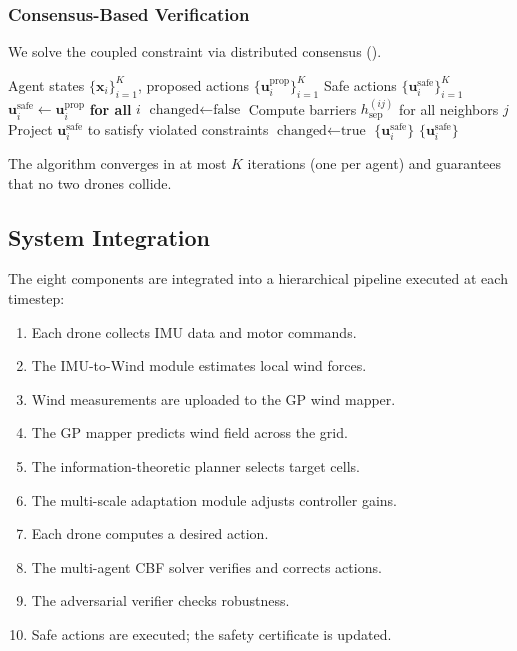 \documentclass[12pt,a4paper,twocolumn]{article}
\newcommand{\vect}[1]{\mathbf{#1}}
\begin{document}
\subsubsection{Consensus-Based Verification}
We solve the coupled constraint via distributed consensus ().

\begin{algorithm}[t]
\caption{Distributed Consensus Safety Verification}
\label{alg:consensus}
\begin{algorithmic}[1]
\Require Agent states $\{\vect{x}_i\}_{i=1}^K$, proposed actions $\{\vect{u}^{\text{prop}}_i\}_{i=1}^K$
\Ensure Safe actions $\{\vect{u}^{\text{safe}}_i\}_{i=1}^K$
\State $\vect{u}^{\text{safe}}_i \leftarrow \vect{u}^{\text{prop}}_i$ \textbf{for all} $i$
    \State $\text{changed} \leftarrow \text{false}$
        \State Compute barriers $h_{\text{sep}}^{(ij)}$ for all neighbors $j$
            \State Project $\vect{u}^{\text{safe}}_i$ to satisfy violated constraints
            \State $\text{changed} \leftarrow \text{true}$
        \EndIf
    \EndFor
        \State \Return $\{\vect{u}^{\text{safe}}_i\}$
    \EndIf
\EndFor
\State \Return $\{\vect{u}^{\text{safe}}_i\}$
\end{algorithmic}
\end{algorithm}

The algorithm converges in at most $K$ iterations (one per agent) and guarantees that no two drones collide.

\subsection{System Integration}
\label{sec:integration}

The eight components are integrated into a hierarchical pipeline executed at each timestep:

\begin{enumerate}[leftmargin=*]
    \item Each drone collects IMU data and motor commands.
    \item The IMU-to-Wind module estimates local wind forces.
    \item Wind measurements are uploaded to the GP wind mapper.
    \item The GP mapper predicts wind field across the grid.
    \item The information-theoretic planner selects target cells.
    \item The multi-scale adaptation module adjusts controller gains.
    \item Each drone computes a desired action.
    \item The multi-agent CBF solver verifies and corrects actions.
    \item The adversarial verifier checks robustness.
    \item Safe actions are executed; the safety certificate is updated.
\end{enumerate}
\end{document}
